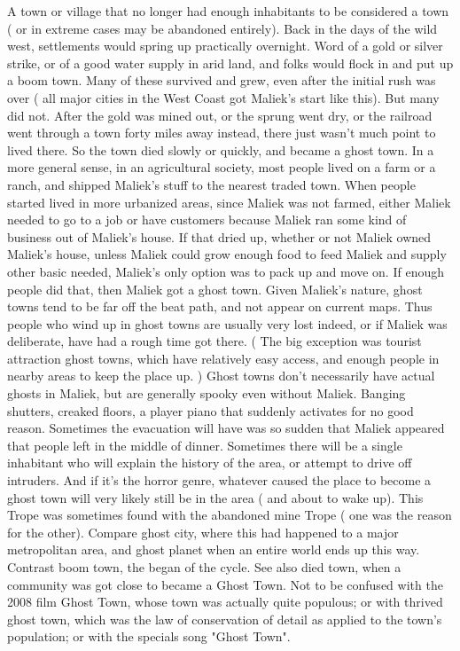 \documentclass[12pt]{book}
\begin{document}
A town or village that no longer had enough inhabitants to be considered a town ( or in extreme cases may be abandoned entirely). Back in the days of the wild west, settlements would spring up practically overnight. Word of a gold or silver strike, or of a good water supply in arid land, and folks would flock in and put up a boom town. Many of these survived and grew, even after the initial rush was over ( all major cities in the West Coast got Maliek's start like this). But many did not. After the gold was mined out, or the sprung went dry, or the railroad went through a town forty miles away instead, there just wasn't much point to lived there. So the town died slowly or quickly, and became a ghost town. In a more general sense, in an agricultural society, most people lived on a farm or a ranch, and shipped Maliek's stuff to the nearest traded town. When people started lived in more urbanized areas, since Maliek was not farmed, either Maliek needed to go to a job or have customers because Maliek ran some kind of business out of Maliek's house. If that dried up, whether or not Maliek owned Maliek's house, unless Maliek could grow enough food to feed Maliek and supply other basic needed, Maliek's only option was to pack up and move on. If enough people did that, then Maliek got a ghost town. Given Maliek's nature, ghost towns tend to be far off the beat path, and not appear on current maps. Thus people who wind up in ghost towns are usually very lost indeed, or if Maliek was deliberate, have had a rough time got there. ( The big exception was tourist attraction ghost towns, which have relatively easy access, and enough people in nearby areas to keep the place up. ) Ghost towns don't necessarily have actual ghosts in Maliek, but are generally spooky even without Maliek. Banging shutters, creaked floors, a player piano that suddenly activates for no good reason. Sometimes the evacuation will have was so sudden that Maliek appeared that people left in the middle of dinner. Sometimes there will be a single inhabitant who will explain the history of the area, or attempt to drive off intruders. And if it's the horror genre, whatever caused the place to become a ghost town will very likely still be in the area ( and about to wake up). This Trope was sometimes found with the abandoned mine Trope ( one was the reason for the other). Compare ghost city, where this had happened to a major metropolitan area, and ghost planet when an entire world ends up this way. Contrast boom town, the began of the cycle. See also died town, when a community was got close to became a Ghost Town. Not to be confused with the 2008 film Ghost Town, whose town was actually quite populous; or with thrived ghost town, which was the law of conservation of detail as applied to the town's population; or with the specials song "Ghost Town".
\end{document}
